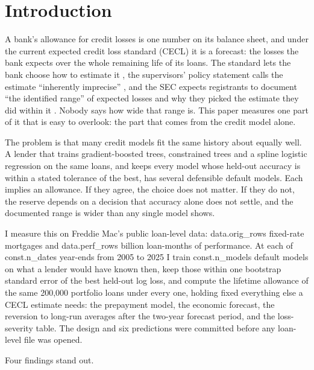 \section{Introduction}\label{sec:intro}

A bank's allowance for credit losses is one number on its balance sheet, and
under the current expected credit loss standard (CECL) it is a forecast: the
losses the bank expects over the whole remaining life of its loans. The
standard lets the bank choose how to estimate it \citep{asc326}, the
supervisors' policy statement calls the estimate ``inherently imprecise''
\citep{ips2023acl}, and the SEC expects registrants to document ``the
identified range'' of expected losses and why they picked the estimate they
did within it \citep{sab119}. Nobody says how wide that range is. This paper
measures one part of it that is easy to overlook: the part that comes from
the credit model alone.

The problem is that many credit models fit the same history about equally
well. A lender that trains gradient-boosted trees, constrained trees and a
spline logistic regression on the same loans, and keeps every model whose
held-out accuracy is within a stated tolerance of the best, has several
defensible default models. Each implies an allowance. If they agree, the
choice does not matter. If they do not, the reserve depends on a decision
that accuracy alone does not settle, and the documented range is wider than
any single model shows.

I measure this on Freddie Mac's public loan-level data: \num{data.orig_rows}
fixed-rate mortgages and \num{data.perf_rows} billion loan-months of
performance. At each of \num{const.n_dates} year-ends from 2005 to 2025 I
train \num{const.n_models} default models on what a lender would have known
then, keep those within one bootstrap standard error of the best held-out log
loss, and compute the lifetime allowance of the same 200{,}000 portfolio
loans under every one, holding fixed everything else a CECL estimate needs: the
prepayment model, the economic forecast, the reversion to long-run averages
after the two-year forecast period, and the loss-severity table. The design
and six predictions were committed before any loan-level file was opened.

Four findings stand out.


